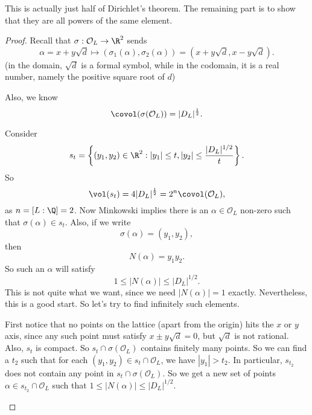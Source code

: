 \documentclass[a4paper]{article}
\begin{document}
This is actually just half of Dirichlet's theorem. The remaining part is to show that they are all powers of the same element.
\begin{proof}
  Recall that $\sigma: \mathcal{O}_L \to \R^2$ sends
  \[
    \alpha = x + y\sqrt{d} \mapsto (\sigma_1(\alpha), \sigma_2(\alpha)) = (x + y\sqrt{d}, x - y\sqrt{d}).
  \]
  (in the domain, $\sqrt{d}$ is a formal symbol, while in the codomain, it is a real number, namely the positive square root of $d$)

  Also, we know
  \[
    \covol(\sigma(\mathcal{O}_L)) = |D_L|^{\frac{1}{2}}.
  \]
  \begin{center}
  \end{center}
  Consider
  \[
    s_t = \left\{(y_1, y_2) \in \R^2: |y_1|\leq t, |y_2| \leq \frac{|D_L|^{1/2}}{t}\right\}.
  \]
  So
  \[
    \vol(s_t) = 4|D_L|^{\frac{1}{2}} = 2^n \covol(\mathcal{O}_L),
  \]
  as $n = [L:\Q] = 2$. Now Minkowski implies there is an $\alpha \in \mathcal{O}_L$ non-zero such that $\sigma(\alpha) \in s_t$. Also, if we write
  \[
    \sigma(\alpha) = (y_1, y_2),
  \]
  then
  \[
    N(\alpha) = y_1y_2.
  \]
  So such an $\alpha$ will satisfy
  \[
    1 \leq |N(\alpha)| \leq |D_L|^{1/2}.
  \]
  This is not quite what we want, since we need $|N(\alpha)| = 1$ exactly. Nevertheless, this is a good start. So let's try to find infinitely such elements.

  First notice that no points on the lattice (apart from the origin) hits the $x$ or $y$ axis, since any such point must satisfy $x \pm y\sqrt{d} = 0$, but $\sqrt{d}$ is not rational. Also, $s_t$ is compact. So $s_t \cap \sigma(\mathcal{O}_L)$ contains finitely many points. So we can find a $t_2$ such that for each $(y_1, y_2) \in s_t \cap \mathcal{O}_L$, we have $|y_1| > t_2$. In particular, $s_{t_2}$ does not contain any point in $s_t \cap \sigma(\mathcal{O}_L)$. So we get a new set of points $\alpha \in s_{t_2} \cap \mathcal{O}_L$ such that $1 \leq |N(\alpha)| \leq |D_L|^{1/2}$.
  \begin{center}
\end{center}
\end{proof}
\end{document}
